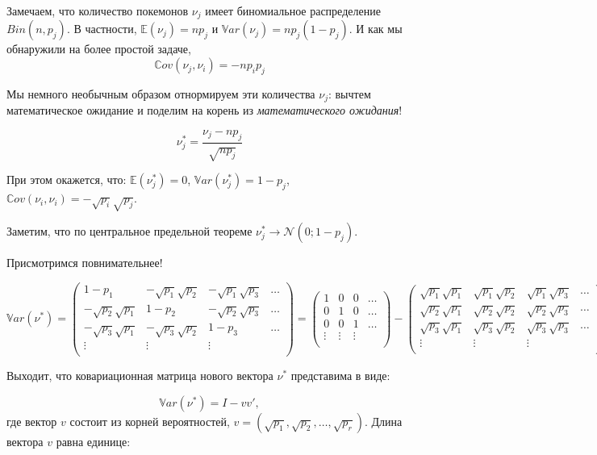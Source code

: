 \documentclass[11pt,russian,]{article}
\newcommand{\cN}{\mathcal{N}}
\newcommand{\E}{\mathbb{E}}
\newcommand{\1}{\mathbbm{1}}
\newcommand{\Var}{\mathbb{V}ar}
\newcommand{\Cov}{\mathbb{C}ov}
\begin{document}
Замечаем, что количество покемонов \(\nu_j\) имеет биномиальное
распределение \(Bin(n, p_j)\). В частности, \(\E(\nu_j) = np_j\) и
\(\Var(\nu_j)=n p_j (1- p_j)\). И как мы обнаружили на более простой
задаче, \[
\Cov(\nu_j, \nu_i) = -np_ip_j
\]

Мы немного необычным образом отнормируем эти количества \(\nu_j\):
вычтем математическое ожидание и поделим на корень из
\emph{математического ожидания}!

\[
\nu_j^* = \frac{\nu_j - np_j}{\sqrt{np_j}}
\]

При этом окажется, что: \(\E(\nu_j^*) = 0\),
\(\Var(\nu_j^*) = 1 - p_j\),
\(\Cov(\nu_i, \nu_i) = - \sqrt{p_i}\sqrt{p_j}\).

Заметим, что по центральное предельной теореме
\(\nu_j^* \to \cN(0; 1 - p_j)\).

Присмотримся повнимательнее!

\[
\Var(\nu^*) = \begin{pmatrix}
1 - p_1 & -\sqrt{p_1}\sqrt{p_2} & -\sqrt{p_1}\sqrt{p_3} & \ldots \\
-\sqrt{p_2}\sqrt{p_1} & 1 - p_2 & -\sqrt{p_2}\sqrt{p_3} & \ldots \\
-\sqrt{p_3}\sqrt{p_1} & -\sqrt{p_3}\sqrt{p_2} & 1 - p_3  & \ldots \\
\vdots & \vdots & \vdots &  \\
\end{pmatrix} =
\begin{pmatrix}
1 & 0 & 0 & \ldots \\
0 & 1 & 0 & \ldots \\
0 & 0 & 1 & \ldots \\
\vdots & \vdots & \vdots &  \\
\end{pmatrix} - \begin{pmatrix}
\sqrt{p_1}\sqrt{p_1} & \sqrt{p_1}\sqrt{p_2} & \sqrt{p_1}\sqrt{p_3} & \ldots \\
\sqrt{p_2}\sqrt{p_1} & \sqrt{p_2}\sqrt{p_2} & \sqrt{p_2}\sqrt{p_3} & \ldots \\
\sqrt{p_3}\sqrt{p_1} & \sqrt{p_3}\sqrt{p_2} & \sqrt{p_3}\sqrt{p_3}  & \ldots \\
\vdots & \vdots & \vdots &  \\
\end{pmatrix}
\]

Выходит, что ковариационная матрица нового вектора \(\nu^*\) представима
в виде:

\[
\Var(\nu^*) = I - vv',
\] где вектор \(v\) состоит из корней вероятностей,
\(v= (\sqrt{p_1}, \sqrt{p_2}, \ldots, \sqrt{p_r})\). Длина вектора \(v\)
равна единице:
\end{document}
